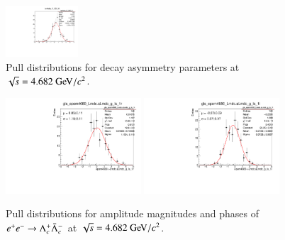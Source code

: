 \begin{figure}[h]
    \includegraphics[width=0.24\textwidth]{figure/io_full_sim/alpha/pull_alpha_lambda_K_892_0.pdf}
    \caption{Pull distributions for decay asymmetry parameters at $\sqrt{s} = 4.682\gev/c^2$.}
\label{fig:io_full_sim_pull_asymmetry}
\end{figure}

\begin{figure}[h]\centering
    \includegraphics[width=0.45\textwidth]{figure/io_full_sim/gls/pull_gls_epem4680_Lmdc.aLmdc_g_ls_1r.pdf}
    \includegraphics[width=0.45\textwidth]{figure/io_full_sim/gls/pull_gls_epem4680_Lmdc.aLmdc_g_ls_1i.pdf}
    \caption{Pull distributions for amplitude magnitudes and phases of $e^+e^-\rightarrow\Lambda_{c}^{+}\bar{\Lambda}_{c}^{-}$ at $\sqrt{s} = 4.682\gev/c^2$.}
\label{fig:io_full_sim_pull_gls}
\end{figure}

\begin{table}[h]
    \caption{Fit results of pull distributions for $\alpha_0$ and $\Delta_0$ for each energy point.}
    \label{tab:fit_io_full_sim_pull_polarization}
\end{table}

